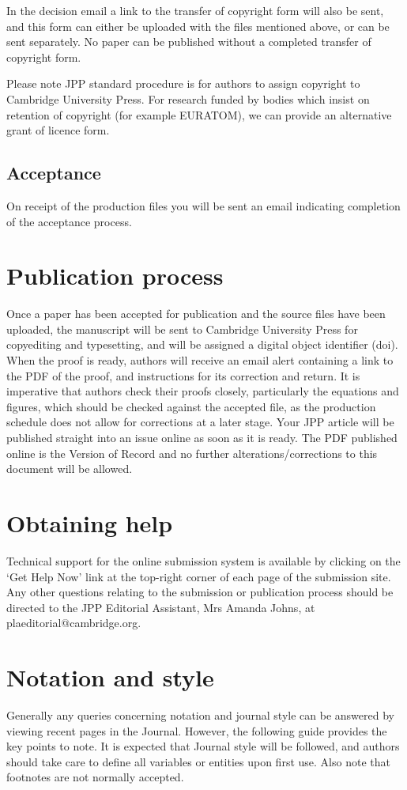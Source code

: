 \documentclass{jpp}
\begin{document}
In the decision email a link to the transfer of copyright form will also be sent, and this form can either be uploaded with the files mentioned above, or can be sent separately. No paper can be published without a completed transfer of copyright form.

Please note JPP standard procedure is for authors to assign copyright to Cambridge University Press. For research funded by bodies which insist on retention of copyright (for example EURATOM), we can provide an alternative grant of licence form. 

\subsection{Acceptance}
On receipt of the production files you will be sent an email indicating completion of the acceptance process.

\section{Publication process}
Once a paper has been accepted for publication and the source files have been uploaded, the manuscript will be sent to Cambridge University Press for copyediting and typesetting, and will be assigned a digital object identifier (doi). When the proof is ready, authors will receive an email alert containing a link to the PDF of the proof, and instructions for its correction and return. It is imperative that authors check their proofs closely, particularly the equations and figures, which should be checked against the accepted file, as the production schedule does not allow for corrections at a later stage. Your JPP article will be published straight into an issue online as soon as it is ready. The PDF published online is the Version of Record and no further alterations/corrections to this document will be allowed.

\section{Obtaining help}
Technical support for the online submission system is available by clicking on the `Get Help Now' link at the top-right corner of each page of the submission site. Any other questions relating to the submission or publication process should be directed to the JPP Editorial Assistant, Mrs Amanda Johns, at plaeditorial@cambridge.org.

\section{Notation and style}\label{notstyle}
Generally any queries concerning notation and journal style can be answered by viewing recent pages in the Journal. However, the following guide provides the key points to note. It is expected that Journal style will be followed, and authors should take care to define all variables or entities upon first use. Also note that footnotes are not normally accepted.
\end{document}
